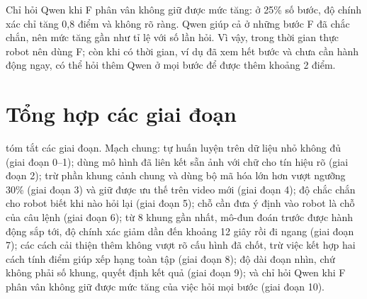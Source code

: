 \documentclass[a4paper,oneside]{report}
\begin{document}
\begin{ketqua}
Chỉ hỏi Qwen khi F phân vân không giữ được mức tăng: ở 25\% số bước, độ chính xác chỉ tăng 0,8 điểm và không rõ ràng. Qwen giúp cả ở những bước F đã chắc chắn, nên mức tăng gần như tỉ lệ với số lần hỏi. Vì vậy, trong thời gian thực robot nên dùng F; còn khi có thời gian, ví dụ đã xem hết bước và chưa cần hành động ngay, có thể hỏi thêm Qwen ở mọi bước để được thêm khoảng 2 điểm.
\end{ketqua}

\section{Tổng hợp các giai đoạn}
\label{sec:summary}

 tóm tắt các giai đoạn. Mạch chung: tự huấn luyện trên dữ liệu nhỏ không đủ (giai đoạn 0--1); dùng mô hình đã liên kết sẵn ảnh với chữ cho tín hiệu rõ (giai đoạn 2); trừ phần khung cảnh chung và dùng bộ mã hóa lớn hơn vượt ngưỡng 30\% (giai đoạn 3) và giữ được ưu thế trên video mới (giai đoạn 4); độ chắc chắn cho robot biết khi nào hỏi lại (giai đoạn 5); chỗ cần đưa ý định vào robot là chỗ của câu lệnh (giai đoạn 6); từ 8 khung gần nhất, mô-đun đoán trước được hành động sắp tới, độ chính xác giảm dần đến khoảng 12 giây rồi đi ngang (giai đoạn 7); các cách cải thiện thêm không vượt rõ cấu hình đã chốt, trừ việc kết hợp hai cách tính điểm giúp xếp hạng toàn tập (giai đoạn 8); độ dài đoạn nhìn, chứ không phải số khung, quyết định kết quả (giai đoạn 9); và chỉ hỏi Qwen khi F phân vân không giữ được mức tăng của việc hỏi mọi bước (giai đoạn 10).
\end{document}
